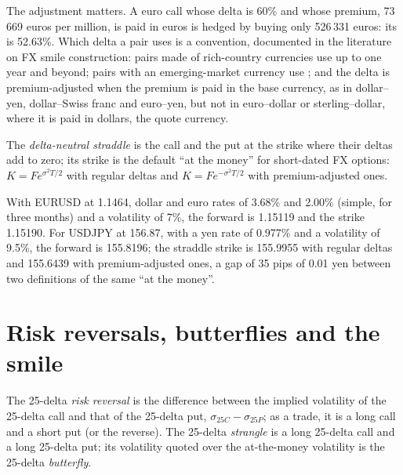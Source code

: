 The adjustment matters. A euro call whose delta is 60\% and whose premium,
73\,669 euros per million, is paid in euros is hedged by buying only 526\,331
euros: its  is 52.63\%. Which delta a pair uses is a
convention, documented in the literature on FX smile construction: pairs made of
rich-country currencies use  up to one year and  beyond;
pairs with an emerging-market currency use ; and the delta is
premium-adjusted when the premium is paid in the base currency, as in dollar--yen,
dollar--Swiss franc and euro--yen, but not in euro--dollar or sterling--dollar,
where it is paid in dollars, the quote currency.

\begin{definition}\label{def:m2:the-fx-options-market:dns}
The \emph{delta-neutral straddle} is the call and the
put at the strike where their deltas add to zero; its strike is the default
``at the money'' for short-dated FX options: $K = F e^{\sigma^2 T/2}$ with regular
deltas and $K = F e^{-\sigma^2 T/2}$ with premium-adjusted ones.
\end{definition}

\begin{example}\label{ex:m2:the-fx-options-market:strikes}
With EURUSD at 1.1464, dollar and euro rates of 3.68\% and 2.00\% (simple, for
three months) and a volatility of 7\%, the forward is 1.15119 and the
 strike 1.15190. For USDJPY at 156.87, with a yen rate of
0.977\% and a volatility of 9.5\%, the forward is 155.8196; the straddle strike is
155.9955 with regular deltas and 155.6439 with premium-adjusted ones, a gap of
35 pips of 0.01 yen between two definitions of the same ``at the money''.
\end{example}

\section{Risk reversals, butterflies and the smile}

\begin{definition}\label{def:m2:the-fx-options-market:rr}
The 25-delta \emph{risk reversal} is the difference between
the implied volatility of the 25-delta call and that of the 25-delta put,
$\sigma_{25C} - \sigma_{25P}$; as a trade, it is a long call and a short put (or
the reverse). The 25-delta \emph{strangle} is a long 25-delta call
and a long 25-delta put; its volatility quoted over the at-the-money volatility is
the 25-delta \emph{butterfly}.
\end{definition}

